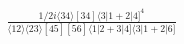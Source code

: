 \documentclass[varwidth, border=5pt]{standalone}
\begin{document}
\begin{my}
$\begin{gathered}
\scriptscriptstyle\frac{1/2i\langle34\rangle[34]\langle3|1+2|4]^4}{\langle12\rangle\langle23\rangle[45][56]\langle1|2+3|4]\langle3|1+2|6]}
\end{gathered}$
\end{my}
\end{document}
